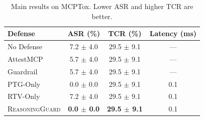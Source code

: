 \begin{table}[t]
\centering
\small
\begin{tabular}{lccc}
\toprule
Defense & ASR (\%) & TCR (\%) & Latency (ms) \\
\midrule
No Defense & 7.2 $\pm$ 4.0 & 29.5 $\pm$ 9.1 & --- \\
AttestMCP & 5.7 $\pm$ 4.0 & 29.5 $\pm$ 9.1 & --- \\
Guardrail & 5.7 $\pm$ 4.0 & 29.5 $\pm$ 9.1 & --- \\
PTG-Only & 0.0 $\pm$ 0.0 & 29.5 $\pm$ 9.1 & 0.1 \\
RTV-Only & 7.2 $\pm$ 4.0 & 29.5 $\pm$ 9.1 & 0.1 \\
\textsc{ReasoningGuard} & \textbf{0.0 $\pm$ 0.0} & \textbf{29.5 $\pm$ 9.1} & 0.1 \\
\bottomrule
\end{tabular}
\caption{Main results on MCPTox. Lower ASR and higher TCR are better.}
\label{tab:main}
\end{table}
